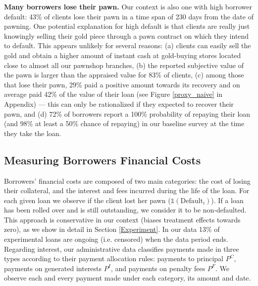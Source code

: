 \documentclass[11pt, a4paper]{article}
\begin{document}
\vspace{.2in}
\noindent \textbf{Many borrowers lose their pawn.} Our context is also one with high borrower default: 43\% of clients lose their pawn in a time span of 230 days from the date of pawning. One potential explanation for high default is that clients are really just knowingly selling their gold piece through a pawn contract on which they intend to default. This appears unlikely for several reasons: (a) clients can easily sell the gold and obtain a higher amount of instant cash at gold-buying stores located close to almost all our pawnshop branches,
(b) the reported subjective value of the pawn is larger than the appraised value for 83\% of clients, (c) among those that lose their pawn, 29\% paid a positive amount towards its recovery and on average paid 42\% of the value of their loan (see Figure \ref{proxy_naive} in Appendix) --- this can only be rationalized if they expected to recover their pawn, and (d) 72\% of borrowers report a 100\% probability of repaying their loan (and 98\% at least a 50\% chance of repaying) in our baseline survey at the time they take the loan.  %

    
\subsection{Measuring Borrowers Financial Costs} 
\label{costs}
    
Borrowers' financial costs are composed of two main categories: the cost of losing their collateral, and the interest and fees incurred during the life of the loan. For each given loan we observe if the client lost her pawn ($\mathds{1}(\text{Default}_i)$). If a loan has been rolled over and is still outstanding, we consider it to be non-defaulted.  This approach is conservative in our context (biases treatment effects towards zero), as we show in detail in Section \ref{Experiment}. In our data 13\% of experimental loans are ongoing (i.e. censored) when the data period ends. Regarding interest, our administrative data classifies payments made in three types according to their payment allocation rules: payments to principal $P^C$, payments on generated interests $P^I$, and payments on penalty fees $P^F$. We observe each and every payment made under each category, its amount and date. 
\end{document}
